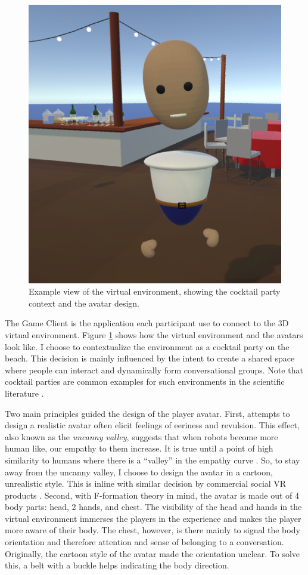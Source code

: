 \documentclass[]{simple-thesis}
\begin{document}
\begin{figure}
  \centering
  \includegraphics[width=.5\textwidth]{../graphics/environment_demo.png}
  \caption{Example view of the virtual environment, showing the cocktail party context and the avatar design.}
  \label{fig:system:environment_demo}
\end{figure}

The Game Client is the application each participant use to connect to the 3D virtual environment.
Figure \ref{fig:system:environment_demo} shows how the virtual environment and the avatars look like.
I choose to contextualize the environment as a cocktail party on the beach.
This decision is mainly influenced by the intent to create a shared space where people can interact and dynamically form conversational groups.
Note that cocktail parties are common examples for such environments in the scientific literature \citep{Setti2015}.

Two main principles guided the design of the player avatar.
First, attempts to design a realistic avatar often elicit feelings of eeriness and revulsion.
This effect, also known as the \textit{uncanny valley}, suggests that when robots become more human like, our empathy to them increase.
It is true until a point of high similarity to humans where there is a ``valley'' in the empathy curve \citep{Mori1970}.
So, to stay away from the uncanny valley, I choose to design the avatar in a cartoon, unrealistic style.
This is inline with similar decision by commercial social VR products \citep{Ghosh2017, AltspaceVR2016, Pot2016}.
Second, with F-formation theory in mind, the avatar is made out of 4 body parts: head, 2 hands, and chest.
The visibility of the head and hands in the virtual environment immerses the players in the experience and makes the player more aware of their body.
The chest, however, is there mainly to signal the body orientation and therefore attention and sense of belonging to a conversation.
Originally, the cartoon style of the avatar made the orientation unclear.
To solve this, a belt with a buckle helps indicating the body direction.
\end{document}
